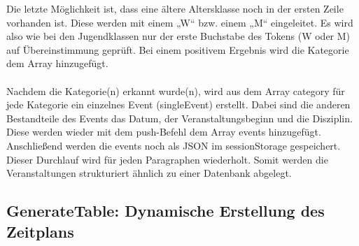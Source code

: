 Die letzte Möglichkeit ist, dass eine ältere Altersklasse noch in der ersten Zeile vorhanden ist. Diese werden mit einem „W“ bzw. einem „M“ eingeleitet. Es wird also wie bei den Jugendklassen nur der erste Buchstabe des Tokens (W oder M) auf Übereinstimmung geprüft. Bei einem positivem Ergebnis wird die Kategorie dem Array hinzugefügt.\\
\\
Nachdem die Kategorie(n) erkannt wurde(n), wird aus dem Array category für jede Kategorie ein einzelnes Event (singleEvent) erstellt. Dabei sind die anderen Bestandteile des Events das Datum, der Veranstaltungsbeginn und die Disziplin. Diese werden wieder mit dem push-Befehl dem Array events hinzugefügt. Anschließend werden die events noch als JSON im sessionStorage gespeichert. 
Dieser Durchlauf wird für jeden Paragraphen wiederholt. Somit werden die Veranstaltungen strukturiert ähnlich zu einer Datenbank abgelegt.

\subsection{GenerateTable: Dynamische Erstellung des Zeitplans}

